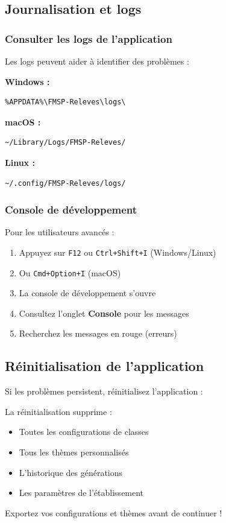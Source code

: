 \subsection{Journalisation et logs}

\subsubsection{Consulter les logs de l'application}

Les logs peuvent aider à identifier des problèmes :

\textbf{Windows :}
\begin{verbatim}
%APPDATA%\FMSP-Releves\logs\
\end{verbatim}

\textbf{macOS :}
\begin{verbatim}
~/Library/Logs/FMSP-Releves/
\end{verbatim}

\textbf{Linux :}
\begin{verbatim}
~/.config/FMSP-Releves/logs/
\end{verbatim}

\subsubsection{Console de développement}

Pour les utilisateurs avancés :

\begin{enumerate}[leftmargin=*]
    \item Appuyez sur \texttt{F12} ou \texttt{Ctrl+Shift+I} (Windows/Linux)
    \item Ou \texttt{Cmd+Option+I} (macOS)
    \item La console de développement s'ouvre
    \item Consultez l'onglet \textbf{Console} pour les messages
    \item Recherchez les messages en rouge (erreurs)
\end{enumerate}

\subsection{Réinitialisation de l'application}

Si les problèmes persistent, réinitialisez l'application :

\begin{tcolorbox}[colback=red!5!white,colframe=red!75!black,title=ATTENTION : Sauvegardez vos données]
La réinitialisation supprime :
\begin{itemize}[leftmargin=*]
    \item Toutes les configurations de classes
    \item Tous les thèmes personnalisés
    \item L'historique des générations
    \item Les paramètres de l'établissement
\end{itemize}

Exportez vos configurations et thèmes avant de continuer !
\end{tcolorbox}

